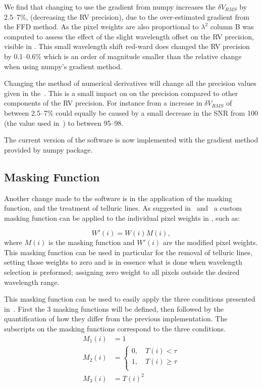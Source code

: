 We find that changing to use the gradient from numpy increases the \(\delta V_{RMS}\) by 2.5--7\%, (decreasing the RV precision), due to the over-estimated gradient from the FFD method. As the pixel weights  are also proportional to \({\lambda}^{2}\) column B was computed to assess the effect of the slight wavelength offset on the RV precision, visible in . This small wavelength shift red-ward does changed the RV precision by 0.1--0.6\% which is an order of magnitude smaller than the relative change when using numpy's gradient method.

Changing the method of numerical derivatives will change all the precision values given in the~\citet{figueira_radial_2016}. This is a small impact on on the precision compared to other components of the RV precision. For instance from  a increase in \(\delta V_{RMS}\) of between 2.5--7\%  could equally be caused by a small decrease in the SNR from 100 (the value used in~\citet{figueira_radial_2016}) to between 95--98.

The current version of the software is now implemented with the gradient method provided by numpy package.

\subsection{Masking Function}
Another change made to the software is in the application of the masking function, and the treatment of telluric lines. As suggested in~\cite{Connes1985} and~\cite{bouchy_fundamental_2001} a custom masking function can be applied to the individual pixel weights in , such as:

\[W'(i) = W(i)M(i),\label{eq:mask_function}\] where \(M(i)\) is the masking function and \(W'(i)\) are the modified pixel weights.
This masking function can be used in particular for the removal of telluric lines, setting those weights to zero and is in essence what is done when wavelength selection is preformed; assigning zero weight to all pixels outside the desired wavelength range.

This masking function can be used to easily apply the three conditions presented in~\citet{figueira_radial_2016}. First  the 3 masking functions will be defined, then followed by the quantification of how they differ from the previous implementation. The subscripts on the masking functions correspond to the three conditions.
\begin{align}
M_1(i) &= 1 \label{eq:mask1}\\
M_2(i) &= \begin{cases}
0, \hspace{1em} T(i) < \tau\\
1, \hspace{1em} T(i) \ge \tau\\
\end{cases}\label{eq:mask2}\\
M_3(i) &= {T(i)}^{2} \label{eq:mask3}
\end{align}

